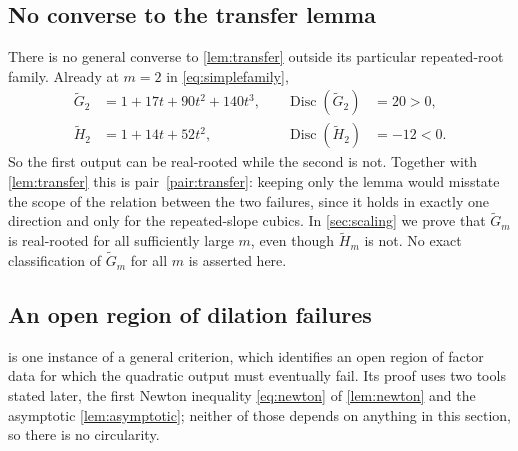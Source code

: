 \documentclass[11pt,letterpaper]{article}
\numberwithin{equation}{section}
\theoremstyle{definition}
\theoremstyle{remark}
\newcommand{\Disc}{\operatorname{Disc}}
\begin{document}
\subsection{No converse to the transfer lemma}\label{subsec:converse}

There is no general converse to \cref{lem:transfer} outside its particular
repeated-root family. Already at $m=2$ in \eqref{eq:simplefamily},
\begin{equation}\label{eq:converse}
\begin{aligned}
 \widetilde G_2&=1+17t+90t^2+140t^3, &\quad \Disc(\widetilde G_2)&=20>0,\\
 \widetilde H_2&=1+14t+52t^2, &\quad \Disc(\widetilde H_2)&=-12<0.
\end{aligned}
\end{equation}
So the first output can be real-rooted while the second is not. Together with
\cref{lem:transfer} this is pair~\ref{pair:transfer}: keeping only the lemma
would misstate the scope of the relation between the two failures, since it
holds in exactly one direction and only for the repeated-slope cubics. In
\cref{sec:scaling} we prove that $\widetilde G_m$ is real-rooted for all
sufficiently large $m$, even though $\widetilde H_m$ is not. No exact
classification of $\widetilde G_m$ for all $m$ is asserted here.

\subsection{An open region of dilation failures}\label{subsec:region}

 is one instance of a general criterion, which
identifies an open region of factor data for which the quadratic output must
eventually fail. Its proof uses two tools stated later, the first Newton
inequality \eqref{eq:newton} of \cref{lem:newton} and the asymptotic
\cref{lem:asymptotic}; neither of those depends on anything in this section,
so there is no circularity.
\end{document}
